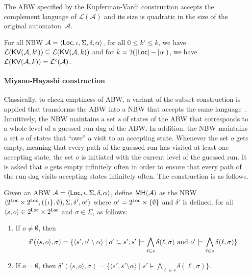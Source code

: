 \documentclass{LMCS}
\def\abs#1{\ensuremath{\lvert #1\rvert}}
\renewcommand{\l}{{\ell}}
\newcommand{\Loc}{{\sf Loc}}
\newcommand{\tuple}[1]{\langle #1 \rangle}
\newcommand{\A}{\mathcal{A}}
\renewcommand{\L}{\mathcal{L}}
\newcommand{\DAG}{{\sc dag}}
\newcommand{\MH}{{\sf MH}}
\newcommand{\KV}{{\sf KV}}
\begin{document}
The ABW specified by the Kupferman-Vardi construction accepts the
complement language of $\L(\A)$ and its size is quadratic in the size of the
original automaton~$\A$.

\begin{thm}\label{theo:complement}
For all NBW $\A = \tuple{\Loc, \iota, \Sigma, \delta,
\alpha}$, for all $0\leq k' \leq k$, we have $\L(\KV(\A,k')) \subseteq \L(\KV(\A,k))$ and 
for $k = 2(\abs{\Loc} - \abs{\alpha})$, we have $\L(\KV(\A,k)) = \L^c(\A)$.
\end{thm}



\paragraph{{\bf Miyano-Hayashi construction}}
Classically, to check emptiness of ABW, a variant 
of the subset construction is applied that transforms the ABW into a NBW 
that accepts the same language~\cite{MiyanoH84}. Intuitively, the NBW 
maintains a set $s$ of states of the ABW that corresponds to a whole
level of a guessed run \DAG\/ of the ABW. In addition, the NBW maintains
a set $o$ of states that ``owe'' a visit to an accepting state. Whenever
the set $o$ gets empty, meaning that every path of the guessed run has visited
at least one accepting state, the set $o$ is initiated with the current
level of the guessed run. It is asked that $o$ gets empty infinitely often
in order to ensure that every path of the run \DAG\/ visits accepting states
infinitely often. The construction is as follows.

\begin{defi}\label{def:MH-construction}
Given an ABW $\A = \tuple{\Loc, \iota, \Sigma, \delta,
\alpha}$, define $\MH(\A)$ as the NBW $\tuple{2^{\Loc} \times 2^{\Loc},
(\{\iota\},\emptyset), \Sigma, \delta', \alpha'}$ where
$\alpha' = 2^{\Loc} \times \{\emptyset\}$ and $\delta'$ is defined,
for all $\tuple{s,o} \in 2^{\Loc} \times 2^{\Loc}$ and $\sigma \in
\Sigma$, as follows:

\begin{enumerate}[$\bullet$] 

\item If $o\neq \emptyset$, then
$$\delta'(\tuple{s,o},\sigma) = \{ \tuple{s',o'\setminus \alpha} \mid o'\subseteq s', 
s' \models \bigwedge_{\l \in s} \delta(\l,\sigma) \textrm{ and }\penalty-1000 o' \models \bigwedge_{\l \in o}
\delta(\l,\sigma)\}$$

\item If $o= \emptyset$, then $\delta'(\tuple{s,o},\sigma) = \{ \tuple{s',s'\setminus \alpha} \mid  
s' \models \bigwedge_{\l \in s} \delta(\l,\sigma)\}$.
\end{enumerate} 

\end{defi}
\end{document}

